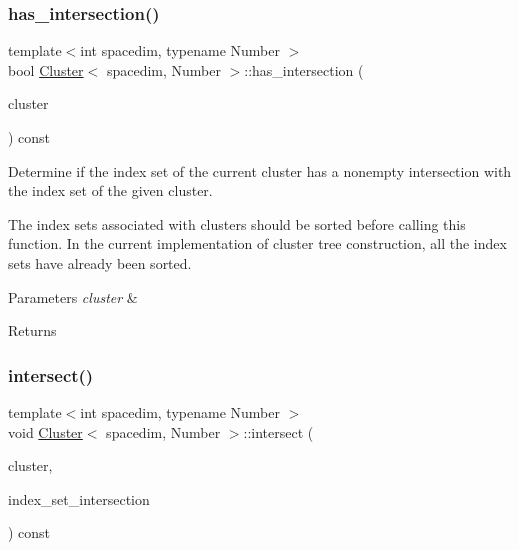 \subsubsection{\texorpdfstring{has\+\_\+intersection()}{has\_intersection()}}
{\footnotesize\ttfamily template$<$int spacedim, typename Number $>$ \\
bool \hyperlink{classCluster}{Cluster}$<$ spacedim, Number $>$\+::has\+\_\+intersection (\begin{DoxyParamCaption}\item[{const \hyperlink{classCluster}{Cluster}$<$ spacedim, Number $>$ \&}]{cluster }\end{DoxyParamCaption}) const}

Determine if the index set of the current cluster has a nonempty intersection with the index set of the given cluster.


\begin{DoxyDescription}
\item[Note ]The index sets associated with clusters should be sorted before calling this function. In the current implementation of cluster tree construction, all the index sets have already been sorted. 
\end{DoxyDescription}
\begin{DoxyParams}{Parameters}
{\em cluster} & \\
\hline
\end{DoxyParams}
\begin{DoxyReturn}{Returns}

\end{DoxyReturn}
\mbox{\label{classCluster_a47961c1b0a34b58266aa3bd87fd36b32}} 
\subsubsection{\texorpdfstring{intersect()}{intersect()}}
{\footnotesize\ttfamily template$<$int spacedim, typename Number $>$ \\
void \hyperlink{classCluster}{Cluster}$<$ spacedim, Number $>$\+::intersect (\begin{DoxyParamCaption}\item[{const \hyperlink{classCluster}{Cluster}$<$ spacedim, Number $>$ \&}]{cluster,  }\item[{std\+::vector$<$ types\+::global\+\_\+dof\+\_\+index $>$ \&}]{index\+\_\+set\+\_\+intersection }\end{DoxyParamCaption}) const}


